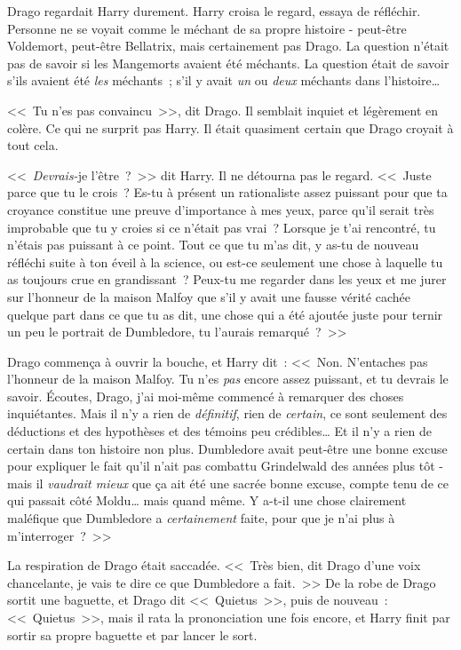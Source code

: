 Drago regardait Harry durement. Harry croisa le regard, essaya de réfléchir. Personne ne se voyait comme le méchant de sa propre histoire - peut-être Voldemort, peut-être Bellatrix, mais certainement pas Drago. La question n'était pas de savoir si les Mangemorts avaient été méchants. La question était de savoir s'ils avaient été \emph{les} méchants~; s'il y avait \emph{un} ou \emph{deux} méchants dans l'histoire…

<<~Tu n'es pas convaincu~>>, dit Drago. Il semblait inquiet et légèrement en colère. Ce qui ne surprit pas Harry. Il était quasiment certain que Drago croyait à tout cela.

<<~\emph{Devrais-}je l'être~?~>> dit Harry. Il ne détourna pas le regard. <<~Juste parce que tu le crois~? Es-tu à présent un rationaliste assez puissant pour que ta croyance constitue une preuve d'importance à mes yeux, parce qu'il serait très improbable que tu y croies si ce n'était pas vrai~? Lorsque je t'ai rencontré, tu n'étais pas puissant à ce point. Tout ce que tu m'as dit, y as-tu de nouveau réfléchi suite à ton éveil à la science, ou est-ce seulement une chose à laquelle tu as toujours crue en grandissant~? Peux-tu me regarder dans les yeux et me jurer sur l'honneur de la maison Malfoy que s'il y avait une fausse vérité cachée quelque part dans ce que tu as dit, une chose qui a été ajoutée juste pour ternir un peu le portrait de Dumbledore, tu l'aurais remarqué~?~>>

Drago commença à ouvrir la bouche, et Harry dit~: <<~Non. N'entaches pas l'honneur de la maison Malfoy. Tu n'es \emph{pas} encore assez puissant, et tu devrais le savoir. Écoutes, Drago, j'ai moi-même commencé à remarquer des choses inquiétantes. Mais il n'y a rien de \emph{définitif}, rien de \emph{certain}, ce sont seulement des déductions et des hypothèses et des témoins peu crédibles… Et il n'y a rien de certain dans ton histoire non plus. Dumbledore avait peut-être une bonne excuse pour expliquer le fait qu'il n'ait pas combattu Grindelwald des années plus tôt - mais il \emph{vaudrait mieux} que ça ait été une sacrée bonne excuse, compte tenu de ce qui passait côté Moldu… mais quand même. Y a-t-il une chose clairement maléfique que Dumbledore a \emph{certainement} faite, pour que je n'ai plus à m'interroger~?~>>

La respiration de Drago était saccadée. <<~Très bien, dit Drago d'une voix chancelante, je vais te dire ce que Dumbledore a fait.~>> De la robe de Drago sortit une baguette, et Drago dit <<~Quietus~>>, puis de nouveau~: <<~Quietus~>>, mais il rata la prononciation une fois encore, et Harry finit par sortir sa propre baguette et par lancer le sort.

